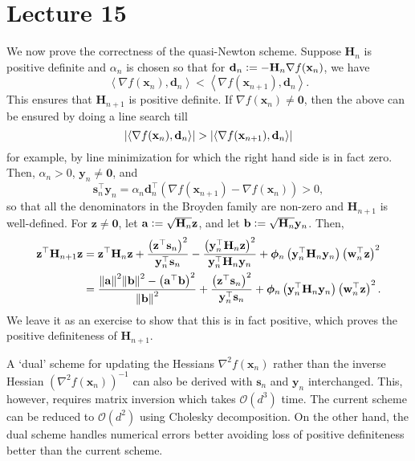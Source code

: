 \section{Lecture 15}

We now prove the correctness of the quasi-Newton scheme. Suppose $\mathbf{H}_n$ is positive definite and $\alpha_n$ is chosen so that for $\mathbf{d}_n \vcentcolon= -\mathbf{H}_n \nabla f(\mathbf{x}_n)$, we have
\[
    \left\langle \nabla f(\mathbf{x}_n), \mathbf{d}_n \right\rangle < \left\langle \nabla f(\mathbf{x}_{n+1}), \mathbf{d}_n \right\rangle.
\]
This ensures that $\mathbf{H}_{n+1}$ is positive definite. If $\nabla f(\mathbf{x}_n) \neq \mathbf{0}$, then the above can be ensured by doing a line search till
\[
    \abs{\left\langle \nabla f(\mathbf{x}_n), \mathbf{d}_n \right\rangle} > \abs{\left\langle \nabla f(\mathbf{x}_{n+1}), \mathbf{d}_n \right\rangle}
\]
for example, by line minimization for which the right hand side is in fact zero. Then, $\alpha_n > 0$, $\mathbf{y}_n \neq \mathbf{0}$, and
\[
    \mathbf{s}_n^{\top} \mathbf{y}_n = \alpha_n \mathbf{d}_n^{\top} \left( \nabla f(\mathbf{x}_{n+1}) - \nabla f(\mathbf{x}_n) \right) > 0,
\]
so that all the denominators in the Broyden family are non-zero and $\mathbf{H}_{n+1}$ is well-defined. For $\mathbf{z} \neq \mathbf{0}$, let $\mathbf{a} \vcentcolon= \sqrt{\mathbf{H}_n} \mathbf{z}$, and let $\mathbf{b} \vcentcolon= \sqrt{\mathbf{H}_n} \mathbf{y}_n$. Then, 
\begin{align*}
    \mathbf{z}^{\top} \mathbf{H}_{n+1} \mathbf{z} &= \mathbf{z}^{\top}\mathbf{H}_n \mathbf{z} + \frac{\left(\mathbf{z}^{\top} \mathbf{s}_n\right)^2}{\mathbf{y}_n^{\top} \mathbf{s}_n} - \frac{\left( \mathbf{y}_n^{\top} \mathbf{H}_n \mathbf{z} \right)^2}{\mathbf{y}_n^{\top}\mathbf{H}_n\mathbf{y}_n} + \bm{\phi}_n \left( \mathbf{y}_n^{\top}\mathbf{H}_n\mathbf{y}_n \right) \left( \mathbf{w}_n^{\top} \mathbf{z} \right)^2 \\
    &= \frac{\norm{\mathbf{a}}^2 \norm{\mathbf{b}}^2 - \left( \mathbf{a}^{\top}\mathbf{b} \right)^2}{\norm{\mathbf{b}}^2} + \frac{\left(\mathbf{z}^{\top} \mathbf{s}_n\right)^2}{\mathbf{y}_n^{\top} \mathbf{s}_n} + \bm{\phi}_n \left( \mathbf{y}_n^{\top}\mathbf{H}_n\mathbf{y}_n \right) \left( \mathbf{w}_n^{\top} \mathbf{z} \right)^2.
\end{align*}
We leave it as an exercise to show that this is in fact positive, which proves the positive definiteness of $\mathbf{H}_{n+1}$. 

A `dual' scheme for updating the Hessians $\nabla^2 f(\mathbf{x}_n)$ rather than the inverse Hessian $(\nabla^2 f(\mathbf{x}_n))^{-1}$ can also be derived with $\mathbf{s}_n$ and $\mathbf{y}_n$ interchanged. This, however, requires matrix inversion which takes $\mathcal{O}(d^3)$ time. The current scheme can be reduced to $\mathcal{O}(d^2)$ using Cholesky decomposition. On the other hand, the dual scheme handles numerical errors better avoiding loss of positive definiteness better than the current scheme. 

